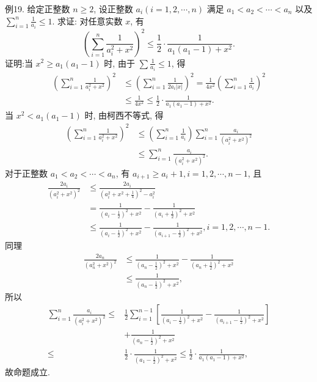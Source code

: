 例19. 给定正整数 $n \geqslant 2$, 设正整数 $a_i(i=1,2, \cdots, n)$ 满足 $a_1< a_2<\cdots<a_n$ 以及 $\sum_{i=1}^n \frac{1}{a_i} \leqslant 1$. 求证: 对任意实数 $x$, 有
$$
\left(\sum_{i=1}^n \frac{1}{a_i^2+x^2}\right)^2 \leqslant \frac{1}{2} \cdot \frac{1}{a_1\left(a_1-1\right)+x^2} .
$$
证明:当 $x^2 \geqslant a_1\left(a_1-1\right)$ 时, 由于 $\sum \frac{1}{a_i} \leqslant 1$, 得
$$
\begin{aligned}
\left(\sum_{i=1}^n \frac{1}{a_i^2+x^2}\right)^2 & \leqslant\left(\sum_{i=1}^n \frac{1}{2 a_i|x|}\right)^2=\frac{1}{4 x^2}\left(\sum_{i=1}^n \frac{1}{a_i}\right)^2 \\
& \leqslant \frac{1}{4 x^2} \leqslant \frac{1}{2} \cdot \frac{1}{a_1\left(a_1-1\right)+x^2} .
\end{aligned}
$$
当 $x^2<a_1\left(a_1-1\right)$ 时, 由柯西不等式, 得
$$
\begin{aligned}
\left(\sum_{i=1}^n \frac{1}{a_i^2+x^2}\right)^2 & \leqslant\left(\sum_{i=1}^n \frac{1}{a_i}\right) \sum_{i=1}^n \frac{a_i}{\left(a_i^2+x^2\right)^2} \\
& \leqslant \sum_{i=1}^n \frac{a_i}{\left(a_i^2+x^2\right)^2} .
\end{aligned}
$$
对于正整数 $a_1<a_2<\cdots<a_n$, 有 $a_{i+1} \geqslant a_i+1, i=1,2, \cdots, n-1$, 且
$$
\begin{aligned}
\frac{2 a_i}{\left(a_i^2+x^2\right)^2} & \leqslant \frac{2 a_i}{\left(a_i^2+x^2+\frac{1}{4}\right)^2-a_i^2} \\
& =\frac{1}{\left(a_i-\frac{1}{2}\right)^2+x^2}-\frac{1}{\left(a_i+\frac{1}{2}\right)^2+x^2} \\
& \leqslant \frac{1}{\left(a_i-\frac{1}{2}\right)^2+x^2}-\frac{1}{\left(a_{i+1}-\frac{1}{2}\right)^2+x^2}, i=1,2, \cdots, n-1 .
\end{aligned}
$$
同理
$$
\begin{aligned}
\frac{2 a_n}{\left(a_n^2+x^2\right)^2} & \leqslant \frac{1}{\left(a_n-\frac{1}{2}\right)^2+x^2}-\frac{1}{\left(a_n+\frac{1}{2}\right)^2+x^2} \\
& \leqslant \frac{1}{\left(a_n-\frac{1}{2}\right)^2+x^2},
\end{aligned}
$$
所以
$$
\begin{aligned}
\sum_{i=1}^n \frac{a_i}{\left(a_i^2+x^2\right)^2} \leqslant & \frac{1}{2} \sum_{i=1}^{n-1}\left[\frac{1}{\left(a_i-\frac{1}{2}\right)^2+x^2}-\frac{1}{\left(a_{i+1}-\frac{1}{2}\right)^2+x^2}\right] \\
& +\frac{1}{\left(a_n-\frac{1}{2}\right)^2+x^2} \\
\leqslant & \frac{1}{2} \cdot \frac{1}{\left(a_1-\frac{1}{2}\right)^2+x^2} \leqslant \frac{1}{2} \cdot \frac{1}{a_1\left(a_1-1\right)+x^2},
\end{aligned}
$$
故命题成立.



